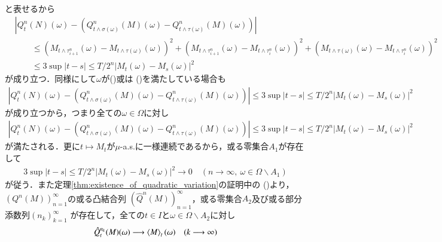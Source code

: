 \begin{prf}
\begin{description}
\begin{align}
				\end{align}
				と表せるから
				\begin{align}
					&\left| Q^n_t(N)(\omega) - \left( Q^n_{t\wedge\sigma(\omega)}(M)(\omega) - Q^n_{t\wedge\tau(\omega)}(M)(\omega) \right) \right| \\
					&\qquad \leq 
						\left( M_{t \wedge \tau_{i+1}^n}(\omega) - M_{t \wedge \tau(\omega)}(\omega) \right)^2
						+ \left( M_{t \wedge \tau_{i+1}^n}(\omega) - M_{t \wedge \tau_i^n}(\omega) \right)^2 
						+ \left( M_{t \wedge \tau(\omega)}(\omega) - M_{t \wedge \tau_{i}^n}(\omega) \right)^2 \\
					&\qquad \leq 3 \sup{|t - s| \leq T/2^n}{|M_t(\omega) - M_s(\omega)|^2}
				\end{align}
				が成り立つ．同様にして$\omega$が()或は
				()を満たしている場合も
				\begin{align}
					\left| Q^n_t(N)(\omega) - \left( Q^n_{t\wedge\sigma(\omega)}(M)(\omega) - Q^n_{t\wedge\tau(\omega)}(M)(\omega) \right) \right|
					\leq 3 \sup{|t - s| \leq T/2^n}{|M_t(\omega) - M_s(\omega)|^2}
				\end{align}
				が成り立つから，つまり全ての$\omega \in \Omega$に対し
				\begin{align}
					\left| Q^n_t(N)(\omega) - \left( Q^n_{t\wedge\sigma(\omega)}(M)(\omega) - Q^n_{t\wedge\tau(\omega)}(M)(\omega) \right) \right|
					\leq 3 \sup{|t - s| \leq T/2^n}{|M_t(\omega) - M_s(\omega)|^2}
					\label{eq:stopped_quadratic_variation_4}
				\end{align}
				が満たされる．更に$t \longmapsto M_t$が$\mu$-a.s.に一様連続であるから，或る零集合$A_1$が存在して
				\begin{align}
					3 \sup{|t - s| \leq T/2^n}{|M_t(\omega) - M_s(\omega)|^2}
					\longrightarrow 0 \quad (n \longrightarrow \infty,\ \omega \in \Omega \backslash A_1)
					\label{eq:stopped_quadratic_variation_5}
				\end{align}
				が従う．また定理\ref{thm:existence_of_quadratic_variation}の証明中の
				()より，$\left( Q^n(M) \right)_{n=1}^{\infty}$の或る凸結合列
				$\left( \hat{Q}^n(M) \right)_{n=1}^{\infty}$，或る零集合$A_2$及び或る部分添数列$(n_k)_{k=1}^{\infty}$
				が存在して，全ての$t \in I$と$\omega \in \Omega \backslash A_2$に対し
				\begin{align}
					\hat{Q}^{n_k}_t(M)(\omega) \longrightarrow \inprod<M>_t(\omega) \quad (k \longrightarrow \infty)
				\end{align}

\end{description}
\end{prf}
